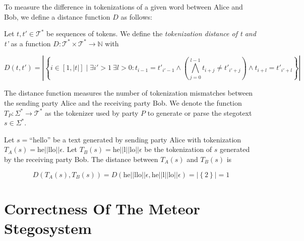 To measure the difference in tokenizations of a given word between Alice and Bob, we define a distance function $D$ as follows:

\begin{definition}
Let $t, t' \in \mathcal{T}^*$ be sequences of tokens.
We define the \emph{tokenization distance of t and t'} as a function $D \colon \mathcal{T}^* \times \mathcal{T}^* \rightarrow \mathbb{N}$ with

$$D(t, t') = \left| \left\{ i \in [1, |t|] \mid \exists i' > 1~ \exists l > 0: t_{i-1} = t'_{i'-1} \land \left( \bigwedge_{j=0}^{l-1} t_{i+j} \neq t'_{i'+j} \right) \land t_{i+l} = t'_{i'+l} \right\} \right|$$
\end{definition}

The distance function measures the number of tokenization mismatches between the sending party Alice and the receiving party Bob.
We denote the function $T_P \colon \Sigma^* \rightarrow \mathcal{T}^*$ as the tokenizer used by party $P$ to generate or parse the stegotext $s \in \Sigma^*$.

\begin{example}
Let $s = \textrm{``hello''}$ be a text generated by sending party Alice with tokenization $T_A(s) = \textrm{he}||\textrm{llo}||\epsilon$.
Let $T_B(s) = \textrm{he}||\textrm{l}||\textrm{lo}||\epsilon$ be the tokenization of $s$ generated by the receiving party Bob.
The distance between $T_A(s)$ and $T_B(s)$ is 

$$
D(T_A(s), T_B(s)) 
= D( \textrm{he}||\textrm{llo}||\epsilon, \textrm{he}||\textrm{l}||\textrm{lo}||\epsilon)
= \left| \left\{ 2 \right\} \right| = 1
$$
\end{example}






\section{Correctness Of The Meteor Stegosystem}

